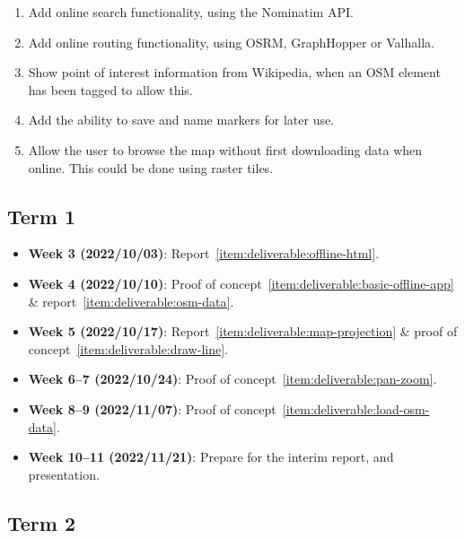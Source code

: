 \documentclass[]{final_report}
\begin{document}
\begin{enumerate}
    \item Add online search functionality, using the Nominatim API.\label{item:deliverable:search}
    \item Add online routing functionality, using OSRM, GraphHopper or Valhalla.\label{item:deliverable:routing}
    \item Show point of interest information from Wikipedia, when an OSM element has been tagged to allow this.\label{item:deliverable:wikipedia}
    \item Add the ability to save and name markers for later use.\label{item:deliverable:markers}
    \item Allow the user to browse the map without first downloading data when online. This could be done using raster tiles.\label{item:deliverable:online}
\end{enumerate}

\subsection{Term 1}

\begin{itemize}
    \item \textbf{Week 3 (2022/10/03)}: Report~\ref{item:deliverable:offline-html}.
    \item \textbf{Week 4 (2022/10/10)}: Proof of concept~\ref{item:deliverable:basic-offline-app} \& report~\ref{item:deliverable:osm-data}.
    \item \textbf{Week 5 (2022/10/17)}: Report~\ref{item:deliverable:map-projection} \& proof of concept~\ref{item:deliverable:draw-line}.
    \item \textbf{Week 6--7 (2022/10/24)}: Proof of concept~\ref{item:deliverable:pan-zoom}.
    \item \textbf{Week 8--9 (2022/11/07)}: Proof of concept~\ref{item:deliverable:load-osm-data}.
    \item \textbf{Week 10--11 (2022/11/21)}: Prepare for the interim report, and presentation.
\end{itemize}

\subsection{Term 2}
\end{document}
